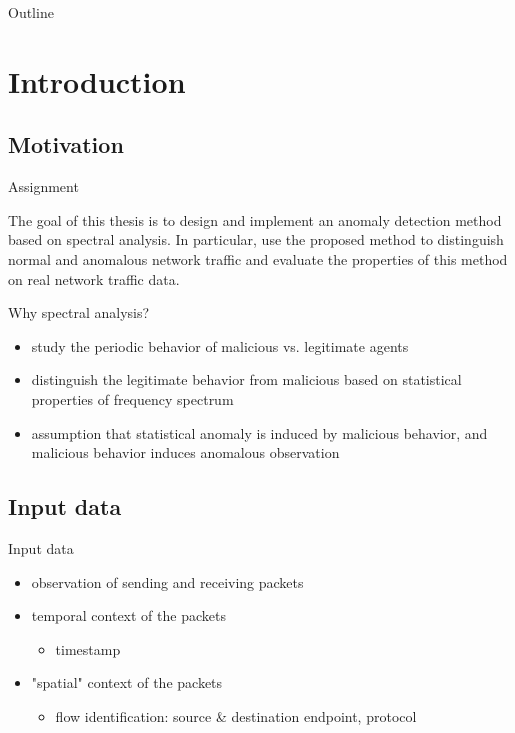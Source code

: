 \documentclass{beamer}
\title{\Title}
\subtitle{\Subject}
\author{\AuthorName}
\date{January 24, 2013}
\begin{document}
\begin{frame}
\titlepage
\end{frame}


\begin{frame}{Outline}
\tableofcontents%
\end{frame}

\section{Introduction}

\subsection{Motivation}

\begin{frame}{Assignment}
\begin{center}
The goal of this thesis is to design and implement an anomaly detection method 
based on spectral analysis.
In particular, use the proposed method to distinguish normal and anomalous 
network traffic and evaluate the
properties of this method on real network traffic data.
\end{center}
\end{frame}

\begin{frame}{Why spectral analysis?}
\begin{itemize}
	\item<1-> study the periodic behavior of malicious vs. legitimate agents
	\item<2-> distinguish the legitimate behavior from malicious 
	based on statistical properties of frequency spectrum
	\item<3-> assumption that statistical anomaly is induced by malicious behavior, 
	and malicious behavior induces anomalous observation
\end{itemize}
\end{frame}

\subsection{Input data}

\begin{frame}{Input data}
\begin{itemize}
	\item<1-> observation of sending and receiving packets
	\item<2-> temporal context of the packets
	\begin{itemize}
		\item<2-> timestamp
	\end{itemize}
	\item<3-> "spatial" context of the packets
	\begin{itemize}
		\item<3-> flow identification: \alert<4->{source \& destination endpoint, protocol}
	\end{itemize}
\end{itemize}
\end{frame}
\end{document}
